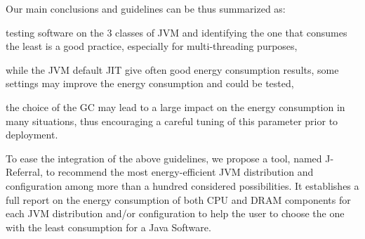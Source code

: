 Our main conclusions and guidelines can be thus summarized as:
\begin{inparaenum}[\em i)]
    \item testing software on the 3 classes of JVM and identifying the one that consumes the least is a good practice, especially for multi-threading purposes,
    \item while the JVM default JIT give often good energy consumption results, some settings may improve the energy consumption and could be tested,
    \item the choice of the GC may lead to a large impact on the energy consumption in many situations, thus encouraging a careful tuning of this parameter prior to deployment.
\end{inparaenum}
To ease the integration of the above guidelines, we propose a tool, named \textsf{J-Referral}, to recommend the most energy-efficient JVM distribution and configuration among more than a hundred considered possibilities.
It establishes a full report on the energy consumption of both CPU and DRAM components for each JVM distribution and/or configuration to help the user to choose the one with the least consumption for a Java Software.
